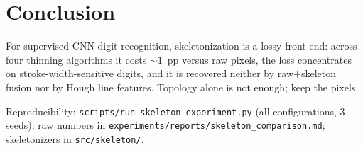 \documentclass{article}
\begin{document}
\section{Conclusion}
For supervised CNN digit recognition, skeletonization is a lossy front-end: across four thinning
algorithms it costs $\sim\!1$~pp versus raw pixels, the loss concentrates on stroke-width-sensitive
digits, and it is recovered neither by raw$+$skeleton fusion nor by Hough line features. Topology
alone is not enough; keep the pixels.

\begin{ack}
Reproducibility: \texttt{scripts/run\_skeleton\_experiment.py} (all configurations, $3$ seeds);
raw numbers in \texttt{experiments/reports/skeleton\_comparison.md}; skeletonizers in
\texttt{src/skeleton/}.
\end{ack}



\end{document}
